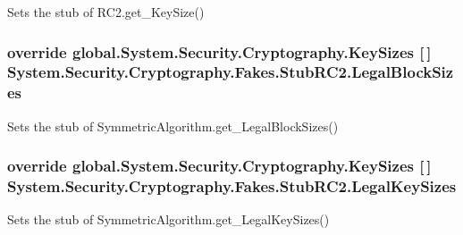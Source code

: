 Sets the stub of R\-C2.\-get\-\_\-\-Key\-Size()

\hypertarget{class_system_1_1_security_1_1_cryptography_1_1_fakes_1_1_stub_r_c2_a73bd00eee152b8fa712a8b9162f329a4}{
\subsubsection[{Legal\-Block\-Sizes}]{\setlength{\rightskip}{0pt plus 5cm}override global.\-System.\-Security.\-Cryptography.\-Key\-Sizes \mbox{[}$\,$\mbox{]} System.\-Security.\-Cryptography.\-Fakes.\-Stub\-R\-C2.\-Legal\-Block\-Sizes\hspace{0.3cm}{\ttfamily [get]}}}\label{class_system_1_1_security_1_1_cryptography_1_1_fakes_1_1_stub_r_c2_a73bd00eee152b8fa712a8b9162f329a4}


Sets the stub of Symmetric\-Algorithm.\-get\-\_\-\-Legal\-Block\-Sizes()

\hypertarget{class_system_1_1_security_1_1_cryptography_1_1_fakes_1_1_stub_r_c2_a7d16fd55f26cd291620a7aa461669b7b}{
\subsubsection[{Legal\-Key\-Sizes}]{\setlength{\rightskip}{0pt plus 5cm}override global.\-System.\-Security.\-Cryptography.\-Key\-Sizes \mbox{[}$\,$\mbox{]} System.\-Security.\-Cryptography.\-Fakes.\-Stub\-R\-C2.\-Legal\-Key\-Sizes\hspace{0.3cm}{\ttfamily [get]}}}\label{class_system_1_1_security_1_1_cryptography_1_1_fakes_1_1_stub_r_c2_a7d16fd55f26cd291620a7aa461669b7b}


Sets the stub of Symmetric\-Algorithm.\-get\-\_\-\-Legal\-Key\-Sizes()

